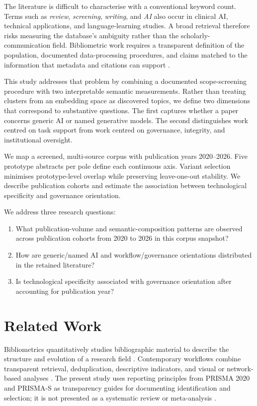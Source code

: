 \documentclass[a4paper,10pt,conference]{IEEEtran}
\begin{document}
The literature is difficult to characterise with a conventional keyword count.
Terms such as \emph{review}, \emph{screening}, \emph{writing}, and \emph{AI}
also occur in clinical AI, technical applications, and language-learning
studies. A broad retrieval therefore risks measuring the database's ambiguity
rather than the scholarly-communication field. Bibliometric work requires a
transparent definition of the population, documented data-processing
procedures, and
claims matched to the information that metadata and citations can support
\cite{pritchard1969,donthu2021,aria2017}.

This study addresses that problem by combining a documented scope-screening
procedure with
two interpretable semantic measurements. Rather than treating clusters from an
embedding space as discovered topics, we define two dimensions that correspond
to substantive questions. The first captures whether a paper concerns generic
AI or named generative models. The second distinguishes work centred on task support from work centred on governance, integrity, and institutional oversight.

We map a screened, multi-source corpus with publication years 2020--2026.
Five prototype abstracts per pole define each continuous axis. Variant selection
minimises prototype-level overlap while preserving leave-one-out stability.
We describe publication cohorts and estimate the association between
technological specificity and governance orientation.

We address three research questions:

\begin{enumerate}
  \item What publication-volume and semantic-composition patterns are observed
  across publication cohorts from 2020 to 2026 in this corpus snapshot?
  \item How are generic/named AI and workflow/governance orientations
  distributed in the retained literature?
  \item Is technological specificity associated with governance orientation
  after accounting for publication year?
\end{enumerate}

\section{Related Work}

Bibliometrics quantitatively studies bibliographic material to describe the
structure and evolution of a research field \cite{pritchard1969}. Contemporary
workflows combine transparent retrieval, deduplication, descriptive indicators,
and visual or network-based analyses \cite{donthu2021,aria2017}. The present
study uses reporting principles from PRISMA 2020 and PRISMA-S as transparency
guides for documenting identification and selection; it is not presented as a
systematic review or meta-analysis \cite{page2021,rethlefsen2021}.
\end{document}
